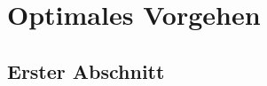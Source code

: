 \newpage
\chapter{Optimales Vorgehen}
\label{sec:optimalesvorgehen}
\section{Erster Abschnitt}
\label{sec:ersterabschnitt}